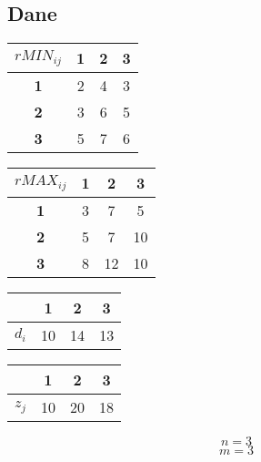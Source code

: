 \documentclass{article}
\begin{document}
\subsection{Dane}
\begin{table}[H]
    \centering
    \begin{tabular}{|c||c|c|c|}
        \hline
        $rMIN_{ij}$ & \textbf{1} & \textbf{2} & \textbf{3} \\
        \hline
        \hline
        \textbf{1} & 2 & 4 & 3 \\
        \hline
        \textbf{2} & 3 & 6 & 5 \\
        \hline
        \textbf{3} & 5 & 7 & 6 \\
        \hline
    \end{tabular}
\end{table}
\begin{table}[H]
    \centering
    \begin{tabular}{|c||c|c|c|}
        \hline
        $rMAX_{ij}$ & \textbf{1} & \textbf{2} & \textbf{3} \\
        \hline
        \hline
        \textbf{1} & 3 & 7 & 5 \\
        \hline
        \textbf{2} & 5 & 7 & 10 \\
        \hline
        \textbf{3} & 8 & 12 & 10 \\
        \hline
    \end{tabular}
\end{table}
\begin{table}[H]
    \centering
    \begin{tabular}{|c||c|c|c|}
        \hline
        \textbf{ } & \textbf{1} & \textbf{2} & \textbf{3} \\
        \hline
        \hline
        $d_i$ & 10 & 14 & 13 \\
        \hline
    \end{tabular}
\end{table}
\begin{table}[H]
    \centering
    \begin{tabular}{|c||c|c|c|}
        \hline
        \textbf{ } & \textbf{1} & \textbf{2} & \textbf{3} \\
        \hline
        \hline
        $z_j$ & 10 & 20 & 18 \\
        \hline
    \end{tabular}
\end{table}
\[n = 3\]
\[m = 3\]
\end{document}
